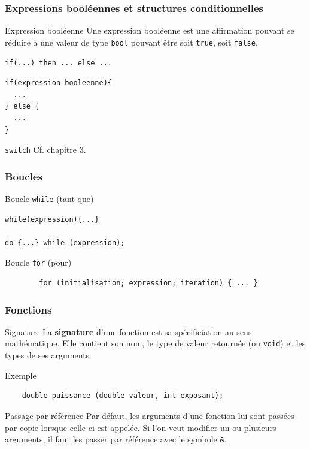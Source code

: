 \begin{frame}[fragile]
	\frametitle{Expressions booléennes et structures conditionnelles}

    \begin{block}{Expression booléenne}
    Une expression booléenne est une affirmation pouvant se réduire à une valeur de type \texttt{bool} pouvant être soit \texttt{true}, soit \texttt{false}.
    \end{block}
    
    \begin{exampleblock}{\texttt{if(...) then ... else ...}}
    \begin{verbatim}
if(expression booleenne){
  ...
} else {
  ...
}
    \end{verbatim}
    \end{exampleblock}
    
    \begin{exampleblock}{\texttt{switch}}
    Cf. chapitre 3.
    \end{exampleblock}
\end{frame}

\begin{frame}[fragile]
	\frametitle{Boucles}
	\begin{block}{Boucle \texttt{while} (tant que)}
		\begin{verbatim}
while(expression){...}

do {...} while (expression);
        \end{verbatim}
	\end{block}
    
	\begin{block}{Boucle \texttt{for} (pour)}
		\begin{verbatim}
        for (initialisation; expression; iteration) { ... }
        \end{verbatim}
	\end{block}
\end{frame}


\begin{frame}[fragile]
	\frametitle{Fonctions}
    \begin{block}{Signature}
    La \textbf{signature} d'une fonction est sa spécificiation au sens mathématique. Elle contient son nom, le type de valeur retournée (ou \texttt{void}) et les types de ses arguments.
    \end{block}
    
    \begin{exampleblock}{Exemple}
    \begin{verbatim}
    double puissance (double valeur, int exposant);
    \end{verbatim}
    \end{exampleblock}
    
    \begin{alertblock}{Passage par référence}
    Par défaut, les arguments d'une fonction lui sont passées par copie lorsque celle-ci est appelée. Si l'on veut modifier un ou plusieurs arguments, il faut les passer par référence avec le symbole \texttt{\&}.
    \end{alertblock}
\end{frame}

